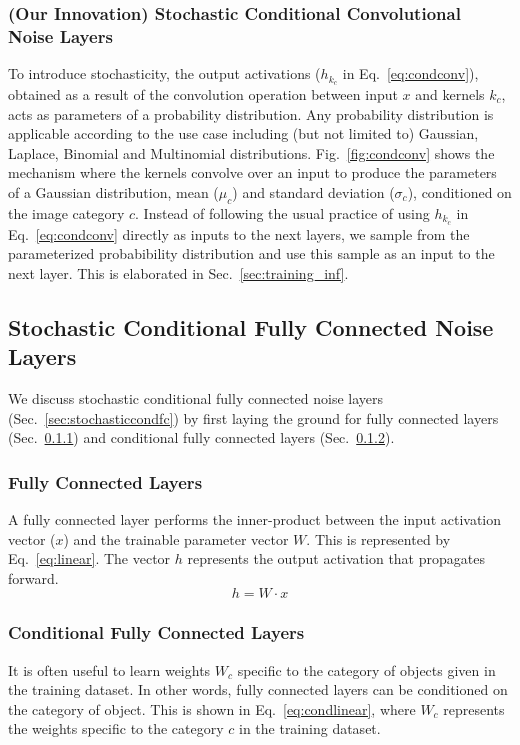 \documentclass[12pt, letterpaper]{article}
\begin{document}
\subsubsection{(Our Innovation) Stochastic Conditional Convolutional Noise Layers}
\label{sec:stochasticcondconv}
To introduce stochasticity, the output activations ($h_{k_c}$ in Eq.~\eqref{eq:condconv}), obtained as a result of the convolution operation between input $x$ and kernels $k_c$, acts as parameters of a probability distribution. 
Any probability distribution is applicable according to the use case including (but not limited to) Gaussian, Laplace, Binomial and Multinomial distributions.  
Fig.~\ref{fig:condconv} shows the mechanism where the kernels convolve over an input to produce the parameters of a Gaussian distribution, mean ($\mu_c$) and standard deviation ($\sigma_c$), conditioned on the image category $c$. Instead of following the usual practice of using $h_{k_c}$ in Eq.~\eqref{eq:condconv} directly as inputs to the next layers, we sample from the parameterized probabibility distribution and use this sample as an input to the next layer. This is elaborated in Sec.~\ref{sec:training_inf}.

\subsection{Stochastic Conditional Fully Connected Noise Layers}
We discuss stochastic conditional fully connected noise layers (Sec.~\ref{sec:stochasticcondfc}) by first laying the ground for fully connected layers (Sec.~\ref{sec:fc}) and conditional fully connected layers (Sec.~\ref{sec:condfc}).

\subsubsection{Fully Connected Layers} 
\label{sec:fc}
A fully connected layer performs the inner-product between the input activation vector ($x$) and the trainable parameter vector $W$.
This is represented by Eq.~\eqref{eq:linear}. The vector $h$ represents the output activation that propagates forward.
\begin{equation}
h=W \cdot x
    \label{eq:linear}
\end{equation}

\subsubsection{Conditional Fully Connected Layers}
\label{sec:condfc}
It is often useful to learn weights $W_c$ specific to the category of objects given in the training dataset. In other words, fully connected layers can be conditioned on the category of object. This is shown in Eq.~\eqref{eq:condlinear}, where $W_c$ represents the weights specific to the category $c$ in the training dataset.
\end{document}
